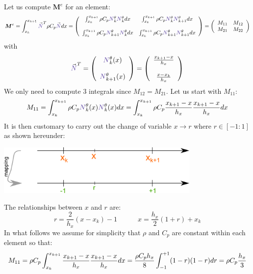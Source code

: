 Let us compute ${\bm M}^e$ for an element:
\[
{\bm M}^e
= \int_{x_k}^{x_{k+1}}   {\vec {\color{Violet}N}}^T \rho C_p {\vec {\color{Violet}N}} dx  
=
\left(
\begin{array}{cc}
\int_{x_k}^{x_{k+1}} \rho C_p {\color{Violet}N}_k^\theta {\color{Violet}N}_{k}^\theta dx   
&  \int_{x_k}^{x_{k+1}} \rho C_p {\color{Violet}N}_k^\theta {\color{Violet}N}_{k+1}^\theta dx \\ \\
\int_{x_k}^{x_{k+1}} \rho C_p {\color{Violet}N}_{k+1}^\theta {\color{Violet}N}_{k}^\theta dx  
&  \int_{x_k}^{x_{k+1}} \rho C_p {\color{Violet}N}_{k+1}^\theta {\color{Violet}N}_{k+1}^\theta dx 
\end{array}
\right)
=
\left(
\begin{array}{cc}
M_{11} & M_{12} \\
M_{21} & M_{22} 
\end{array}
\right)
\]
with 
\[
{\vec {\color{Violet}N}}^T = 
\left(
\begin{array}{c}
{\color{Violet}N}_k^\theta(x)  \\ \\  {\color{Violet}N}_{k+1}^\theta(x)
\end{array}
\right)
=
\left(
\begin{array}{c}
\frac{x_{k+1}-x}{h_x}   \\ \\
\frac{x-x_k}{h_x} 
\end{array}
\right)
\]
We only need to compute 3 integrals since $M_{12}=M_{21}$.
Let us start with $M_{11}$:
\[
M_{11}=\int_{x_k}^{x_{k+1}} \rho C_p {\color{Violet}N}_k^\theta(x) {\color{Violet}N}_{k}^\theta(x) dx
=   
\int_{x_k}^{x_{k+1}} \rho C_p 
\frac{x_{k+1}-x}{h_x}  
\frac{x_{k+1}-x}{h_x}  
dx
\]
It is then customary to carry out the change of variable $x \rightarrow r$ where 
$r \in [-1:1]$ as shown hereunder:
\begin{center}
\includegraphics[width=10cm]{images/oneD/el1D_mapping}
\end{center}
The relationships between $x$ and $r$ are:
\[
r=\frac{2}{h_x}(x-x_k)-1
\quad\quad\quad
x=\frac{h_x}{2}(1+r)+x_k
\]
In what follows we assume for simplicity that $\rho$ and $C_p$ are constant within each element so that:
\[
M_{11}=
\rho C_p
\int_{\tiny x_k}^{x_{k+1}} 
\frac{x_{k+1}-x}{h_x}  
\frac{x_{k+1}-x}{h_x}  
dx
=  \frac{\rho C_p h_x}{8} \int_{-1}^{+1} (1-r) (1-r)  dr  = \rho C_p \frac{h_x}{3} 
\]
